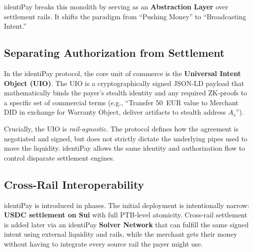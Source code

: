 \documentclass[11pt]{article}
\begin{document}
identiPay breaks this monolith by serving as an \textbf{Abstraction Layer} over settlement rails. It shifts the paradigm from ``Pushing Money'' to ``Broadcasting Intent.''

\subsection{Separating Authorization from Settlement}
In the identiPay protocol, the core unit of commerce is the \textbf{Universal Intent Object (UIO)}. The UIO is a cryptographically signed JSON-LD payload that mathematically binds the payer's stealth identity and any required ZK-proofs to a specific set of commercial terms (e.g., ``Transfer 50~EUR value to Merchant DID in exchange for Warranty Object, deliver artifacts to stealth address $A_s$'').

Crucially, the UIO is \emph{rail-agnostic}. The protocol defines how the agreement is negotiated and signed, but does not strictly dictate the underlying pipes used to move the liquidity. identiPay allows the same identity and authorization flow to control disparate settlement engines.

\subsection{Cross-Rail Interoperability}
identiPay is introduced in phases. The initial deployment is intentionally narrow: \textbf{USDC settlement on Sui} with full PTB-level atomicity. Cross-rail settlement is added later via an identiPay \textbf{Solver Network} that can fulfill the same signed intent using external liquidity and rails, while the merchant gets their money without having to integrate every source rail the payer might use.
\end{document}
